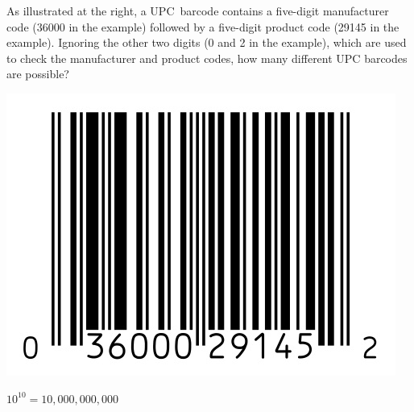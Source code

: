 \documentclass[answers,addpoints,12pt]{exam}
\begin{document}
\begin{questions}

\begin{multicols}{2}
\question[10]
As illustrated at the right,
a UPC~barcode contains
a five-digit manufacturer code (36000 in the example)
followed by a five-digit product code
(29145 in the example).
Ignoring the other two digits
(0 and 2 in the example), which are used to check 
the manufacturer and product codes,
how many different
UPC barcodes are possible?
\break\\
\begin{center}\includegraphics[scale=.25]{Barcode}\end{center}
\end{multicols}
\begin{solution}$10^{10}=10,000,000,000$\end{solution}
\ifprintanswers\else\newpage\fi


\end{questions}
\end{document}
